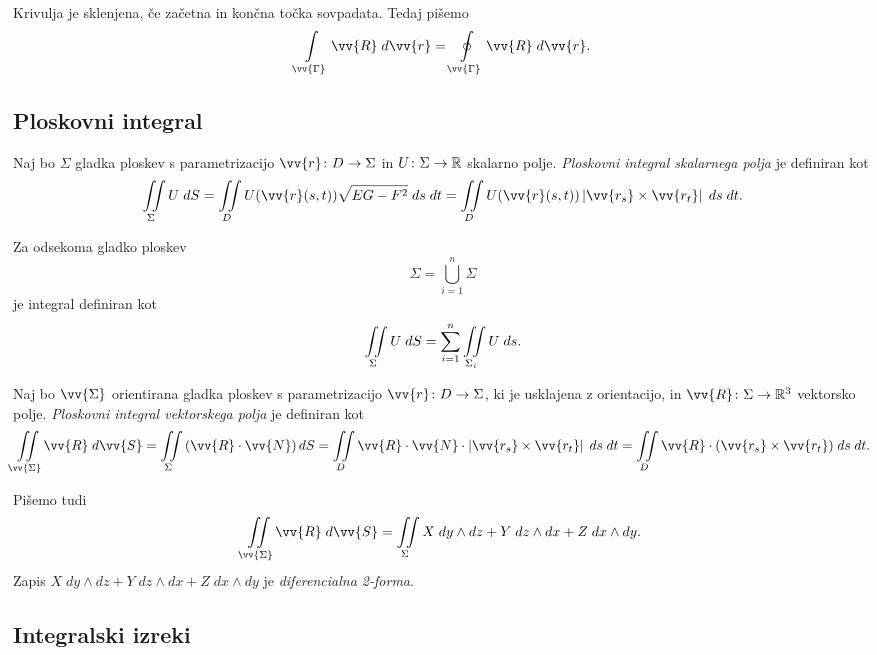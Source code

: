 \begin{opomba}
Krivulja je sklenjena, če začetna in končna točka sovpadata. Tedaj
pišemo
\[
\lint_{\vv{\Gamma}} \vv{R}\;d\vv{r} =
\olint_{\vv{\Gamma}} \vv{R}\;d\vv{r}.
\]
\end{opomba}

\newpage

\subsection{Ploskovni integral}

\begin{definicija}
Naj bo $\Sigma$ gladka ploskev s parametrizacijo
$\vv{r} \colon D \to \Sigma$ in $U \colon \Sigma \to \mathbb{R}$ skalarno
polje.
\emph{Ploskovni integral skalarnega polja}
je definiran kot
\[
\liint_\Sigma U\;dS =
\liint_D U(\vv{r}(s,t)) \sqrt{EG - F^2}\;ds\;dt =
\liint_D U(\vv{r}(s,t)) \abs{\vv{r_s} \times \vv{r_t}}\;ds\;dt.
\]
\end{definicija}

\begin{opomba}
Za odsekoma gladko ploskev
\[
\Sigma = \bigcup_{i=1}^n \Sigma
\]
je integral definiran kot
\[
\iint\limits_\Sigma U\;dS =
\sum_{i=1}^n \iint\limits_{\Sigma_i} U\;ds.
\]
\end{opomba}

\begin{definicija}
Naj bo $\vv{\Sigma}$ orientirana gladka ploskev s parametrizacijo
$\vv{r} \colon D \to \Sigma$, ki je usklajena z orientacijo, in
$\vv{R} \colon \Sigma \to \R^3$ vektorsko polje. \emph{Ploskovni
integral vektorskega polja} je definiran kot
\[
\liint_{\vv{\Sigma}} \vv{R}\;d\vv{S} =
\liint_\Sigma \left(\vv{R} \cdot \vv{N}\right)dS =
\liint_D \vv{R} \cdot \vv{N} \cdot
\abs{\vv{r_s} \times \vv{r_t}}\;ds\;dt =
\liint_D \vv{R} \cdot (\vv{r_s} \times \vv{r_t})\;ds\;dt.
\]
\end{definicija}

\begin{opomba}
Pišemo tudi
\[
\liint_{\vv{\Sigma}} \vv{R}\;d\vv{S} =
\liint_\Sigma X\;dy \wedge dz + Y\;dz \wedge dx + Z\;dx \wedge dy.
\]
Zapis $X\;dy \wedge dz + Y\;dz \wedge dx + Z\;dx \wedge dy$ je
\emph{diferencialna 2-forma}.
\end{opomba}

\newpage

\subsection{Integralski izreki}

